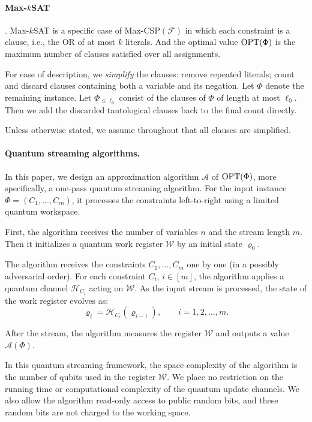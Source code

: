 \paragraph{Max-$k$SAT}. Max-$k$SAT is a specific case of Max-CSP$(\mathcal F)$ in which each constraint is a clause, i.e., the OR of at most $k$ literals. And the optimal value $\operatorname{OPT}(\Phi)$ is the maximum number of clauses satisfied over all assignments.



For ease of  description, we  \textit{simplify} the clauses:  remove repeated literals; count and discard clauses containing both a variable and its negation. Let $\Phi$ denote the remaining instance. Let $\Phi_{\le\ell_0}$ consist of the clauses of $\Phi$ of length at most $\ell_0$. Then we add the discarded tautological clauses back to the final count directly.

Unless otherwise stated, we assume throughout that all clauses are simplified.


\paragraph{Quantum streaming algorithms.}
In this paper, we design an approximation algorithm $\mathcal{A}$ of $\operatorname{OPT}(\Phi)$, more specifically, a one-pass quantum streaming algorithm. For the input instance $\Phi = (C_1,...,C_m)$, it processes the constraints left-to-right using a limited quantum workspace. 




First, the algorithm receives the number of variables $n$ and the stream length $m$. Then it initializes a quantum work register $\mathcal W$  by an initial state $\varrho_0$.



    
The algorithm receives the constraints $C_1, \ldots, C_m$ one by one (in a possibly adversarial order). For each constraint $C_i$, $i\in [m]$, the algorithm applies a quantum channel $\mathcal H_{C_i}$ acting on $\mathcal W$. As the input stream is processed, the state of the work register evolves as:
\[
  \varrho_i =  \mathcal H_{C_i}(\varrho_{i-1}), \qquad i=1,2,\ldots,m.
\]
    
After the stream, the algorithm measures the register $\mathcal W$ and outputs a value $\mathcal{A}(\Phi)$.



In this quantum streaming framework, the space complexity of the algorithm is the number of qubits used in the register $\mathcal{W}$. We place no restriction on the running time or computational complexity of the quantum update channels. We also allow the algorithm read-only access to public random bits, and these random bits are not charged to the working space.  













